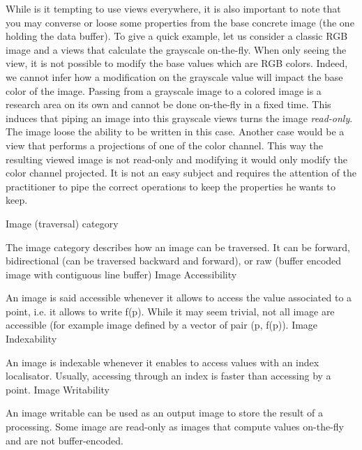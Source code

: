 While is it tempting to use views everywhere, it is also important to note that you may converse or loose some
properties from the base concrete image (the one holding the data buffer). To give a quick example, let us consider a
classic RGB image and a views that calculate the grayscale on-the-fly. When only seeing the view, it is not possible to
modify the base values which are RGB colors. Indeed, we cannot infer how a modification on the grayscale value will
impact the base color of the image. Passing from a grayscale image to a colored image is a research area on its own and
cannot be done on-the-fly in a fixed time. This induces that piping an image into this grayscale views turns the image
\emph{read-only}. The image loose the ability to be written in this case. Another case would be  a view that performs a
projections of one of the color channel. This way the resulting viewed image is not read-only and modifying it would
only modify the color channel projected. It is not an easy subject and requires the attention of the practitioner to
pipe the correct operations to keep the properties he wants to keep.



Image (traversal) category

The image category describes how an image can be traversed. It can be forward, bidirectional (can be traversed backward and forward), or raw (buffer encoded image with contiguous line buffer)
Image Accessibility

An image is said accessible whenever it allows to access the value associated to a point, i.e. it allows to write f(p). While it may seem trivial, not all image are accessible (for example image defined by a vector of pair (p, f(p)).
Image Indexability

An image is indexable whenever it enables to access values with an index localisator. Usually, accessing through an index is faster than accessing by a point.
Image Writability

An image writable can be used as an output image to store the result of a processing. Some image are read-only as images that compute values on-the-fly and are not buffer-encoded.


